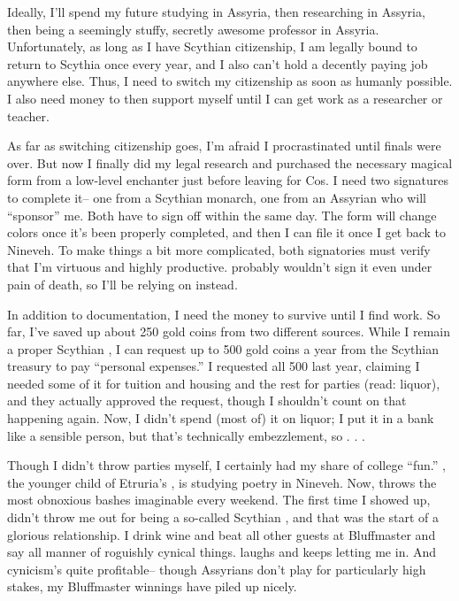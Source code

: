 \documentclass[char]{Kos}
\begin{document}
Ideally, I'll spend my future studying in Assyria, then researching in Assyria, then being a seemingly stuffy, secretly awesome professor in Assyria. Unfortunately, as long as I have Scythian citizenship, I am legally bound to return to Scythia once every year, and I also can't hold a decently paying job anywhere else. Thus, I need to switch my citizenship as soon as humanly possible. I also need money to then support myself until I can get work as a researcher or teacher.

As far as switching citizenship goes, I'm afraid I procrastinated until finals were over. But now I finally did my legal research and purchased the necessary magical form from a low-level enchanter just before leaving for Cos. I need two signatures to complete it-- one from a Scythian monarch, one from an Assyrian who will ``sponsor'' me. Both have to sign off within the same day. The form will change colors once it's been properly completed, and then I can file it once I get back to Nineveh. To make things a bit more complicated, both signatories must verify that I'm virtuous and highly productive. \cScythiaQueen{\Monarch} \cScythiaQueen{} probably wouldn't sign it even under pain of death, so I'll be relying on \cScythiaKing{} instead.

In addition to documentation, I need the money to survive until I find work. So far, I've saved up about 250 gold coins from two different sources. While I remain a proper Scythian \cWard{\prince}, I can request up to 500 gold coins a year from the Scythian treasury to pay ``personal expenses.'' I requested all 500 last year, claiming I needed some of it for tuition and housing and the rest for parties (read: liquor), and they actually approved the request, though I shouldn't count on that happening again. Now, I didn't spend (most of) it on liquor; I put it in a bank like a sensible person, but that's technically embezzlement, so . . . 

Though I didn't throw parties myself, I certainly had my share of college ``fun.'' \cPoet{\Prince} \cPoet{}, the younger child of Etruria's \cEtruriaKing{\Monarch} \cEtruriaKing{}, is studying poetry in Nineveh. Now, \cPoet{\they} throws the most obnoxious bashes imaginable every weekend. The first time I showed up, \cPoet{\they} didn't throw me out for being a so-called Scythian \cWard{\prince}, and that was the start of a glorious relationship. I drink \cPoet{\their} wine and beat all \cPoet{\their} other guests at Bluffmaster and say all manner of roguishly cynical things. \cPoet{\They} laughs and keeps letting me in. And cynicism's quite profitable-- though Assyrians don't play for particularly high stakes, my Bluffmaster winnings have piled up nicely.
\end{document}
